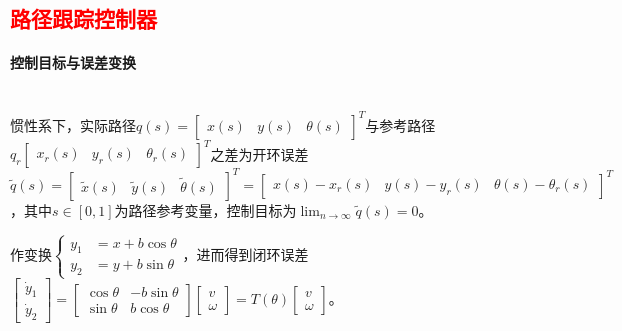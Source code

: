 \documentclass[
12pt, %
a4paper, 
oneside, %
]{scrartcl}
\begin{document}
\subsection[路径跟踪控制器]{\textcolor{red}{路径跟踪控制器}}
\paragraph{控制目标与误差变换}~\\

惯性系下，实际路径$ q(s) = \begin{bmatrix} x(s) & y(s) & \theta(s) \end{bmatrix}^T $与参考路径$ q_r \begin{bmatrix} x_r(s) & y_r(s) & \theta_r(s) \end{bmatrix}^T $之差为开环误差$ \tilde{q}(s) = \begin{bmatrix} \tilde{x}(s) & \tilde{y}(s) & \tilde{\theta}(s) \end{bmatrix}^T = \begin{bmatrix} x(s) - x_r(s) & y(s) - y_r(s) & \theta(s) - \theta_r(s) \end{bmatrix}^T $，其中$ s \in [0, 1] $为路径参考变量，控制目标为$ \lim_{n \to \infty} \tilde{q}(s) = 0 $。

作变换$ \begin{cases} y_1 &= x + b \cos\theta \\ y_2 &= y + b \sin\theta \end{cases} $，进而得到闭环误差$ \begin{bmatrix} \dot{y}_1 \\ \dot{y}_2 \end{bmatrix} = \begin{bmatrix} \cos\theta & -b \sin\theta \\ \sin\theta & b \cos\theta \end{bmatrix} \begin{bmatrix} v \\ \omega \end{bmatrix} = T(\theta) \begin{bmatrix} v \\ \omega \end{bmatrix} $。
\end{document}

